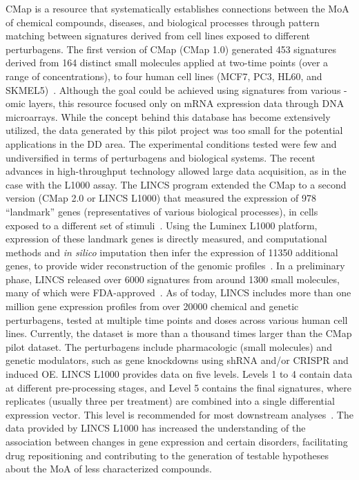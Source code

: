 \gls{CMap} is a resource that systematically establishes connections between the \gls{MoA} of chemical compounds, diseases, and biological processes through pattern matching between signatures derived from cell lines exposed to different perturbagens. The first version of CMap (CMap 1.0) generated 453 signatures derived from 164 distinct small molecules applied at two-time points (over a range of concentrations), to four human cell lines (MCF7, PC3, HL60, and SKMEL5)~\cite{RN34}.
Although the goal could be achieved using signatures from various -omic layers, this resource focused only on mRNA expression data through \gls{DNA} microarrays. While the concept behind this database has become extensively utilized, the data generated by this pilot project was too small for the potential applications in the \gls{DD} area. The experimental conditions tested were few and undiversified in terms of perturbagens and biological systems. 
The recent advances in high-throughput technology allowed large data acquisition, as in the case with the L1000 assay.
The \gls{LINCS} program extended the CMap to a second version (CMap 2.0 or LINCS L1000) that measured the expression of 978 “landmark” genes (representatives of various biological processes), in cells exposed to a different set of stimuli~\cite{RN30}. 
Using the Luminex L1000 platform, expression of these landmark genes is directly measured, and computational methods and \textit{in silico} imputation then infer the expression of 11350 additional genes, to provide wider reconstruction of the genomic profiles~\cite{RN30}. 
In a preliminary phase, LINCS released over 6000 signatures from around 1300 small molecules, many of which were FDA-approved~\cite{RN115}. 
As of today, LINCS includes more than one million gene expression profiles from over 20000 chemical and genetic perturbagens, tested at multiple time points and doses across various human cell lines. 
Currently, the dataset is more than a thousand times larger than the CMap pilot dataset. 
The perturbagens include pharmacologic (small molecules) and genetic modulators, such as gene knockdowns using \gls{shRNA} and/or CRISPR and induced \gls{OE}. 
LINCS L1000 provides data on five levels. 
Levels 1 to 4 contain data at different pre-processing stages, and Level 5 contains the final signatures, where replicates (usually three per treatment) are combined into a single differential expression vector. 
This level is recommended for most downstream analyses~\cite{RN30}. 
The data provided by LINCS L1000 has increased the understanding of the association between changes in gene expression and certain disorders, facilitating drug repositioning and contributing to the generation of testable hypotheses about the \gls{MoA} of less characterized compounds. 

